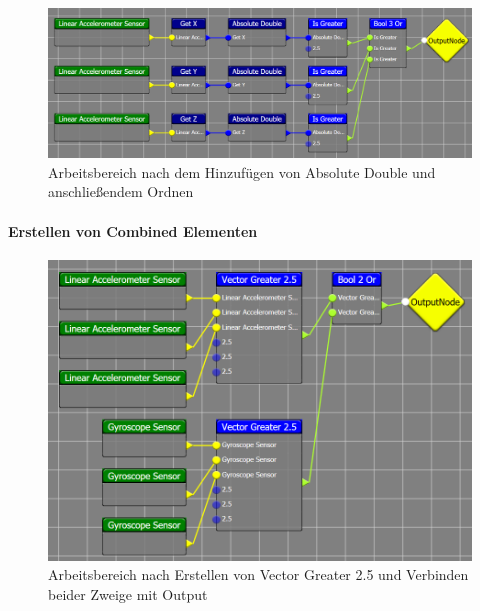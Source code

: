 \begin{figure}[h!]
	\centering
		\includegraphics[width = \textwidth]{Manual/13_organize}
	\caption{Arbeitsbereich nach dem Hinzuf\"ugen von Absolute Double und anschlie{\ss}endem Ordnen}
	\label{fig:13_organize}
\end{figure}


\paragraph{Erstellen von Combined Elementen}

\begin{figure}[h!]
	\centering
		\includegraphics[width = \textwidth]{Manual/14_combined}
	\caption{Arbeitsbereich nach Erstellen von Vector Greater 2.5 und Verbinden beider Zweige mit Output}
	\label{fig:14_combined}
\end{figure}

